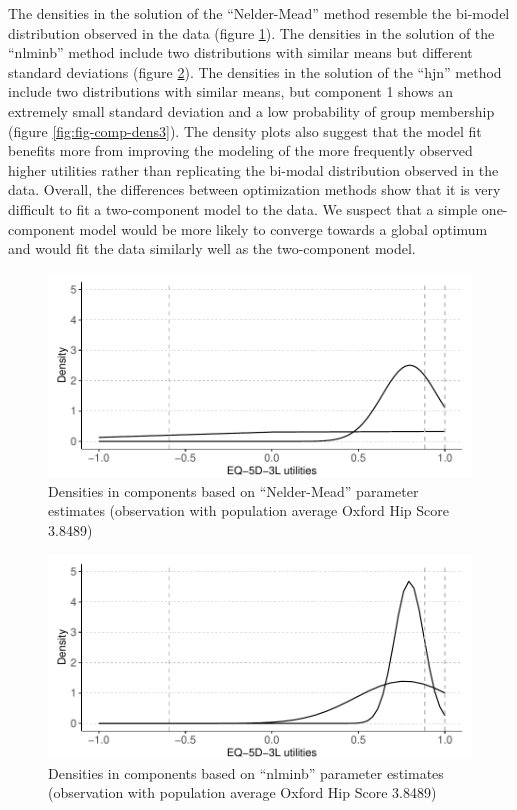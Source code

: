 \documentclass[
]{article}
\begin{document}
The densities in the solution of the ``Nelder-Mead'' method resemble the bi-model distribution observed in the data (figure \ref{fig:fig-comp-dens1}). The densities in the solution of the ``nlminb'' method include two distributions with similar means but different standard deviations (figure \ref{fig:fig-comp-dens2}). The densities in the solution of the ``hjn'' method include two distributions with similar means, but component 1 shows an extremely small standard deviation and a low probability of group membership (figure \ref{fig:fig-comp-dens3}). The density plots also suggest that the model fit benefits more from improving the modeling of the more frequently observed higher utilities rather than replicating the bi-modal distribution observed in the data. Overall, the differences between optimization methods show that it is very difficult to fit a two-component model to the data. We suspect that a simple one-component model would be more likely to converge towards a global optimum and would fit the data similarly well as the two-component model.

\begin{figure}
\centering
\includegraphics{aldvmm_vignette_files/figure-latex/fig-comp-dens1-1.pdf}
\caption{\label{fig:fig-comp-dens1}Densities in components based on ``Nelder-Mead'' parameter estimates (observation with population average Oxford Hip Score 3.8489)}
\end{figure}

\begin{figure}
\centering
\includegraphics{aldvmm_vignette_files/figure-latex/fig-comp-dens2-1.pdf}
\caption{\label{fig:fig-comp-dens2}Densities in components based on ``nlminb'' parameter estimates (observation with population average Oxford Hip Score 3.8489)}
\end{figure}
\end{document}
